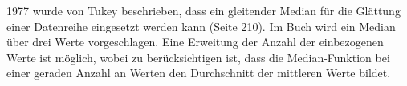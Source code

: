 1977 wurde von Tukey beschrieben, dass ein gleitender Median für die Glättung einer Datenreihe eingesetzt werden kann (Seite 210). Im Buch wird ein Median über drei Werte vorgeschlagen. Eine Erweitung der Anzahl der einbezogenen Werte ist möglich, wobei zu berücksichtigen ist, dass die Median-Funktion bei einer geraden Anzahl an Werten den Durchschnitt der mittleren Werte bildet.  








